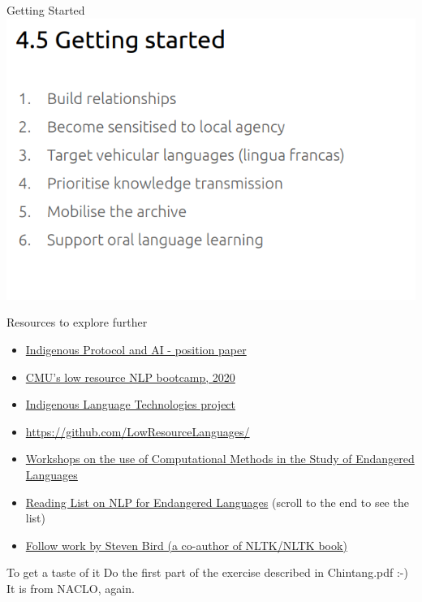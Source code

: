 \documentclass{beamer}
\begin{document}
\begin{frame}{Getting Started}
    \includegraphics[width=\textwidth]{figures/gettingstarted-bird.PNG}
\end{frame}

\begin{frame}{Resources to explore further}
    \begin{itemize}
        \item \href{https://spectrum.library.concordia.ca/986506/7/Indigenous_Protocol_and_AI_2020.pdf}{Indigenous Protocol and AI - position paper}
        \item \href{https://github.com/neubig/lowresource-nlp-bootcamp-2020}{CMU's low resource NLP bootcamp, 2020}
        \item \href{https://nrc.canada.ca/en/research-development/research-collaboration/programs/canadian-indigenous-languages-technology-project}{Indigenous Language Technologies project}
        \item \url{https://github.com/LowResourceLanguages/}
        \item \href{https://computel-workshop.org/}{Workshops on the use of Computational Methods in the Study of Endangered Languages}
    \item \href{https://www.aclweb.org/anthology/2020.coling-tutorials.7.pdf}{Reading List on NLP for Endangered Languages} (scroll to the end to see the list)
     \item \href{https://scholar.google.com/citations?user=xoyloJAAAAAJ&hl=en&oi=ao}{Follow work by Steven Bird (a co-author of NLTK/NLTK book)}
    \end{itemize}
\end{frame}

\begin{frame}{To get a taste of it}
Do the first part of the exercise described in Chintang.pdf :-) It is from NACLO, again. 
    
\end{frame}
\end{document}
